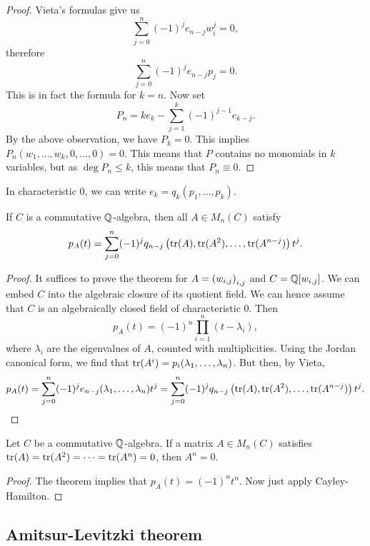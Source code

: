 \begin{proof}
Vieta's formulas give us
\[
\sum_{j=0}^n (-1)^j e_{n-j} w_i^j = 0,
\]
therefore
\[
\sum_{j=0}^n (-1)^j e_{n-j} p_j = 0.
\]
This is in fact the formula for $k=n$. Now set
\[
P_n = k e_k - \sum_{j=1}^k (-1)^{j-1} e_{k-j}.
\]
By the above observation, we have $P_k = 0$. This implies
$P_n(w_1, \dots, w_k, 0, \dots, 0) = 0$. This means that $P$
contains no monomials in $k$ variables, but as $\deg P_n \leq k$,
this means that $P_n \equiv 0$.
\end{proof}

\begin{opomba}
In characteristic $0$, we can write $e_k = q_k(p_1, \dots, p_k)$.
\end{opomba}

\begin{izrek}
If $C$ is a commutative $\mathbb{Q}$-algebra, then all $A \in M_n(C)$
satisfy
\[
p_A(t) =
\sum_{j=0}^n
(-1)^j q_{n-j} \left(\operatorname{tr}(A), \operatorname{tr}(A^2), \dots, \operatorname{tr}(A^{n-j})\right) t^j.
\]
\end{izrek}

\begin{proof}
It suffices to prove the theorem for $A = \left(w_{i,j}\right)_{i,j}$ and
$C = \mathbb{Q}[w_{i,j}]$. We can embed $C$ into the algebraic closure of
its quotient field. We can hence assume that $C$ is an
algebraically closed field of characteristic $0$. Then
\[
p_A(t) = (-1)^n \prod_{i=1}^n (t - \lambda_i),
\]
where $\lambda_i$ are the eigenvalues of $A$, counted with
multiplicities. Using the Jordan canonical form, we find that
$\operatorname{tr}(A^i) = p_i(\lambda_1, \dots, \lambda_n)$. But then, by Vieta,
\[
p_A(t) =
\sum_{j=0}^n (-1)^j e_{n-j}(\lambda_1, \dots, \lambda_n) t^j =
\sum_{j=0}^n
(-1)^j q_{n-j} \left(\operatorname{tr}(A), \operatorname{tr}(A^2), \dots, \operatorname{tr}(A^{n-j})\right) t^j.
\qedhere
\]
\end{proof}

\begin{posledica}
Let $C$ be a commutative $\mathbb{Q}$-algebra. If a matrix $A \in M_n(C)$
satisfies $\operatorname{tr}(A) = \operatorname{tr}(A^2) = \dots = \operatorname{tr}(A^n) = 0$, then
$A^n = 0$.
\end{posledica}

\begin{proof}
The theorem implies that $p_A(t) = (-1)^n t^n$. Now just apply
Cayley-Hamilton.
\end{proof}

\newpage

\subsection{Amitsur-Levitzki theorem}

